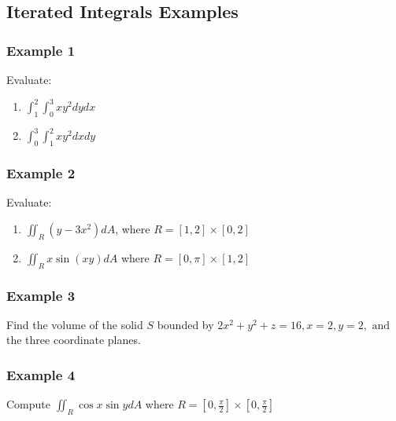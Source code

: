 \documentclass[12pt]{article}
\begin{document}
\subsection{Iterated Integrals Examples}
\subsubsection{ Example 1} 
Evaluate: 
\begin{enumerate}
	\item \(\int_{1}^{2} \int_{0}^{3} xy^2dydx\)
	\item \(\int_{0}^{3} \int_{1}^{2} xy^2dxdy\)
\end{enumerate}

\subsubsection{Example 2}
Evaluate:
\begin{enumerate}
	\item \(\iint_{R}(y-3x^2)dA\), where \(R = [1,2] \times [0,2]\)
	\item \(\iint_{R}x\sin(xy)dA\) where \(R = [0,\pi] \times [1,2]\)
\end{enumerate}

\subsubsection{Example 3}
Find the volume of the solid \(S\) bounded by \(2x^2 + y^2 + z = 16,x=2,y=2, \text{ and }\) the three coordinate planes.

\subsubsection{Example 4}
Compute \(\iint_{R}\cos{x}\sin{y}dA\) where \(R = [0,\frac{\pi}{2}] \times  [0, \frac{\pi}{2}]\)
\end{document}
